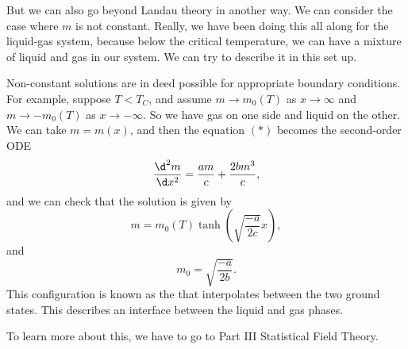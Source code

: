 \documentclass[a4paper]{article}
\begin{document}
But we can also go beyond Landau theory in another way. We can consider the case where $m$ is not constant. Really, we have been doing this all along for the liquid-gas system, because below the critical temperature, we can have a mixture of liquid and gas in our system. We can try to describe it in this set up.

Non-constant solutions are in deed possible for appropriate boundary conditions. For example, suppose $T < T_C$, and assume $m \to m_0(T)$ as $x \to \infty$ and $m \to - m_0(T)$ as $x \to -\infty$. So we have gas on one side and liquid on the other. We can take $m = m(x)$, and then the equation $(*)$ becomes the second-order ODE
\[
  \frac{\d^2 m}{\d x^2} = \frac{am}{c} + \frac{2b m^3}{c},
\]
and we can check that the solution is given by
\[
  m = m_0(T) \tanh\left(\sqrt{\frac{-a}{2c}} x\right),
\]
and
\[
  m_0 = \sqrt{\frac{-a}{2b}}.
\]
This configuration is known as the  that interpolates between the two ground states. This describes an interface between the liquid and gas phases.

To learn more about this, we have to go to Part III Statistical Field Theory.
\printindex
\end{document}
